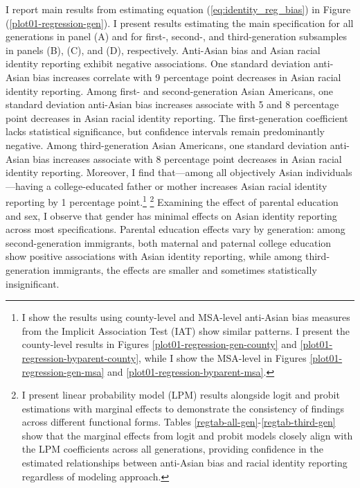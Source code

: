 I report main results from estimating equation (\ref{eq:identity_reg_bias}) in Figure (\ref{plot01-regression-gen}). I present results estimating the main specification for all generations in panel (A) and for first-, second-, and third-generation subsamples in panels (B), (C), and (D), respectively. Anti-Asian bias and Asian racial identity reporting exhibit negative associations. One standard deviation anti-Asian bias increases correlate with 9 percentage point decreases in Asian racial identity reporting. Among first- and second-generation Asian Americans, one standard deviation anti-Asian bias increases associate with 5 and 8 percentage point decreases in Asian racial identity reporting. The first-generation coefficient lacks statistical significance, but confidence intervals remain predominantly negative. Among third-generation Asian Americans, one standard deviation anti-Asian bias increases associate with 8 percentage point decreases in Asian racial identity reporting. Moreover, I find that---among all objectively Asian individuals---having a college-educated father or mother increases Asian racial identity reporting by 1 percentage point.\footnote{I show the results using county-level and MSA-level anti-Asian bias measures from the Implicit Association Test (IAT) show similar patterns. I present the county-level results in Figures \ref{plot01-regression-gen-county} and \ref{plot01-regression-byparent-county}, while I show the MSA-level in Figures \ref{plot01-regression-gen-msa} and \ref{plot01-regression-byparent-msa}.} \footnote{I present linear probability model (LPM) results alongside logit and probit estimations with marginal effects to demonstrate the consistency of findings across different functional forms. Tables \ref{regtab-all-gen}-\ref{regtab-third-gen} show that the marginal effects from logit and probit models closely align with the LPM coefficients across all generations, providing confidence in the estimated relationships between anti-Asian bias and racial identity reporting regardless of modeling approach.} Examining the effect of parental education and sex, I observe that gender has minimal effects on Asian identity reporting across most specifications. Parental education effects vary by generation: among second-generation immigrants, both maternal and paternal college education show positive associations with Asian identity reporting, while among third-generation immigrants, the effects are smaller and sometimes statistically insignificant.

